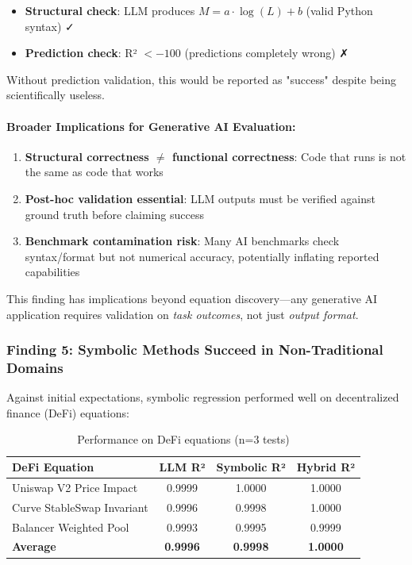 \begin{itemize}
    \item \textbf{Structural check}: LLM produces $M = a \cdot \log(L) + b$ (valid Python syntax) ✓
    \item \textbf{Prediction check}: R² $< -100$ (predictions completely wrong) ✗
\end{itemize}

Without prediction validation, this would be reported as "success" despite being scientifically useless.

\paragraph{Broader Implications for Generative AI Evaluation:}

\begin{enumerate}
    \item \textbf{Structural correctness $\neq$ functional correctness}: Code that runs is not the same as code that works

    \item \textbf{Post-hoc validation essential}: LLM outputs must be verified against ground truth before claiming success

    \item \textbf{Benchmark contamination risk}: Many AI benchmarks check syntax/format but not numerical accuracy, potentially inflating reported capabilities
\end{enumerate}

This finding has implications beyond equation discovery—any generative AI application requires validation on \emph{task outcomes}, not just \emph{output format}.


\subsubsection{Finding 5: Symbolic Methods Succeed in Non-Traditional Domains}

Against initial expectations, symbolic regression performed well on decentralized finance (DeFi) equations:

\begin{table}[h]
\centering
\begin{tabular}{lccc}
\toprule
\textbf{DeFi Equation} & \textbf{LLM R²} & \textbf{Symbolic R²} & \textbf{Hybrid R²} \\
\midrule
Uniswap V2 Price Impact & 0.9999 & 1.0000 & 1.0000 \\
Curve StableSwap Invariant & 0.9996 & 0.9998 & 1.0000 \\
Balancer Weighted Pool & 0.9993 & 0.9995 & 0.9999 \\
\midrule
\textbf{Average} & \textbf{0.9996} & \textbf{0.9998} & \textbf{1.0000} \\
\bottomrule
\end{tabular}
\caption{Performance on DeFi equations (n=3 tests)}
\label{tab:defi_performance}
\end{table}

